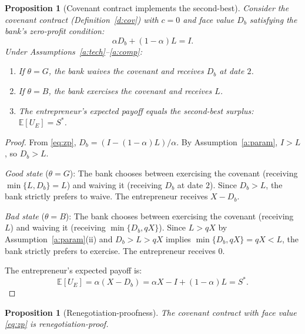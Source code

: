 \documentclass[12pt,a4paper]{article}
\theoremstyle{plain}
\newtheorem{proposition}[theorem]{Proposition}
\theoremstyle{definition}
\theoremstyle{remark}
\newcommand{\E}{\mathbb{E}}
\begin{document}
\begin{proposition}[Covenant contract implements the second-best]\label{p:cov}
Consider the covenant contract (Definition~\ref{d:cov}) with $c = 0$ and face value $D_b$ satisfying the bank's zero-profit condition:
\begin{equation}\label{eq:zp}
\alpha D_b + (1-\alpha)L = I.
\end{equation}
Under Assumptions~\ref{a:tech}--\ref{a:comp}:
\begin{enumerate}[nosep,label=(\alph*)]
\item If $\theta = G$, the bank waives the covenant and receives $D_b$ at date $2$.
\item If $\theta = B$, the bank exercises the covenant and receives $L$.
\item The entrepreneur's expected payoff equals the second-best surplus: $\E[U_E] = S^*$.
\end{enumerate}
\end{proposition}

\begin{proof}
From \eqref{eq:zp}, $D_b = (I - (1-\alpha)L)/\alpha$. By Assumption~\ref{a:param}, $I > L$, so $D_b > L$.

\textit{Good state} ($\theta = G$): The bank chooses between exercising the covenant (receiving $\min\{L, D_b\} = L$) and waiving it (receiving $D_b$ at date $2$). Since $D_b > L$, the bank strictly prefers to waive. The entrepreneur receives $X - D_b$.

\textit{Bad state} ($\theta = B$): The bank chooses between exercising the covenant (receiving $L$) and waiving it (receiving $\min\{D_b, qX\}$). Since $L > qX$ by Assumption~\ref{a:param}(ii) and $D_b > L > qX$ implies $\min\{D_b, qX\} = qX < L$, the bank strictly prefers to exercise. The entrepreneur receives $0$.

The entrepreneur's expected payoff is:
\[
\E[U_E] = \alpha(X - D_b) = \alpha X - I + (1-\alpha)L = S^*.
\]
\end{proof}

\begin{proposition}[Renegotiation-proofness]\label{p:reneg}
The covenant contract with face value \eqref{eq:zp} is renegotiation-proof.
\end{proposition}
\end{document}
